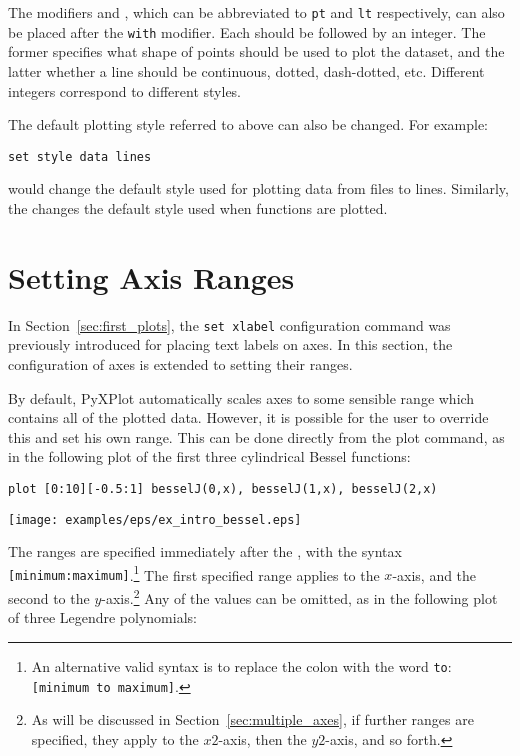 \label{sec:pointtype}
The modifiers  and , which can be
abbreviated to {\tt pt} and {\tt lt} respectively, can also be placed after the
{\tt with} modifier. Each should be followed by an integer.  The former
specifies what shape of points should be used to plot the dataset, and the
latter whether a line should be continuous, dotted, dash-dotted, etc.
Different integers correspond to different styles.

The default plotting style referred to above can also be changed.  For example:

\begin{verbatim}
set style data lines
\end{verbatim}

\noindent would change the default style used for plotting data from files to
lines. Similarly, the  changes the default style
used when functions are plotted.


\section{Setting Axis Ranges}
\label{sec:plot_ranges}

In Section~\ref{sec:first_plots}, the {\tt set xlabel} configuration command
was previously introduced for placing text labels on axes. In this section, the
configuration of axes is extended to setting their ranges.

By default, PyXPlot automatically scales axes to some sensible range which
contains all of the plotted data. However, it is possible for the user to
override this and set his own range. This can be
done directly from the plot command, as in the following plot of the first
three cylindrical Bessel functions:

\begin{verbatim}
plot [0:10][-0.5:1] besselJ(0,x), besselJ(1,x), besselJ(2,x)
\end{verbatim}
\begin{center}
\texttt{[image: examples/eps/ex\_intro\_bessel.eps]}
\end{center}

\noindent The ranges are specified immediately after the , with
the syntax {\tt [minimum:maximum]}.\footnote{An alternative valid syntax is to
replace the colon with the word {\tt to}: {\tt [minimum to maximum]}.} The
first specified range applies to the $x$-axis, and the second to the
$y$-axis.\footnote{As will be discussed in Section~\ref{sec:multiple_axes}, if
further ranges are specified, they apply to the $x2$-axis, then the $y2$-axis,
and so forth.} Any of the values can be omitted, as in the following plot of
three Legendre polynomials:

